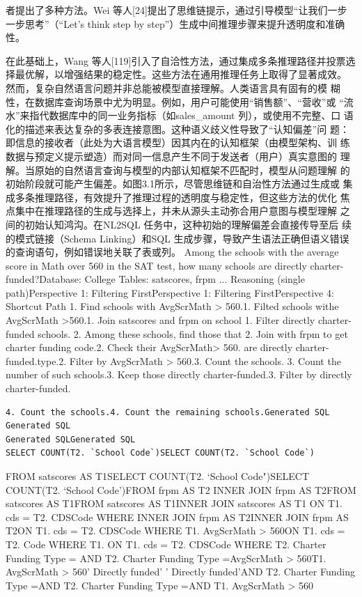 \documentclass[12pt,a4paper,openright,UTF8]{ctexbook}
\begin{document}
者提出了多种方法。Wei 等人[24]提出了思维链提示，通过引导模型“让我们一步 一步思考”（“Let’s think step by step”）生成中间推理步骤来提升透明度和准确性。

在此基础上，Wang 等人[119]引入了自洽性方法，通过集成多条推理路径并投票选 择最优解，以增强结果的稳定性。这些方法在通用推理任务上取得了显著成效。 然而，复杂自然语言问题并非总能被模型直接理解。人类语言具有固有的模 糊性，在数据库查询场景中尤为明显。例如，用户可能使用“销售额”、“营收”或 “流水”来指代数据库中的同一业务指标（如sales\_amount 列），或使用不完整、口 语化的描述来表达复杂的多表连接意图。这种语义歧义性导致了“认知偏差”问 题：即信息的接收者（此处为大语言模型）因其内在的认知框架（由模型架构、训 练数据与预定义提示塑造）而对同一信息产生不同于发送者（用户）真实意图的 理解。当原始的自然语言查询与模型的内部认知框架不匹配时，模型从问题理解 的初始阶段就可能产生偏差。如图3.1所示，尽管思维链和自治性方法通过生成或 集成多条推理路径，有效提升了推理过程的透明度与稳定性，但这些方法的优化 焦点集中在推理路径的生成与选择上，并未从源头主动弥合用户意图与模型理解 之间的初始认知鸿沟。在NL2SQL 任务中，这种初始的理解偏差会直接传导至后 续的模式链接（Schema Linking）和SQL 生成步骤，导致产生语法正确但语义错误 的查询语句，例如错误地关联了表或列。 Among the schools with the average score in Math over 560 in the SAT test, how many schools are directly charter-funded?Database: College Tables: satscores, frpm ... Reasoning (single path)Perspective 1: Filtering FirstPerspective 1: Filtering FirstPerspective 4: Shortcut Path 1. Find schools with AvgScrMath > 560.1. Filted schools withe AvgScrMath >560.1. Join satscores and frpm on school 1. Filter directly charter-funded schools. 2. Among these schools, find those that 2. Join with frpm to get charter funding code.2. Check their AvgScrMath> 560. are directly charter-funded.type.2. Filter by AvgScrMath > 560.3. Count the schools. 3. Count the number of such schools.3. Keep those directly charter-funded.3. Filter by directly charter-funded.

\begin{lstlisting}
4. Count the schools.4. Count the remaining schools.Generated SQL
Generated SQL
Generated SQLGenerated SQL
SELECT COUNT(T2. `School Code`)SELECT COUNT(T2. `School Code`)
\end{lstlisting}
FROM satscores AS T1SELECT COUNT(T2. `School Code")SELECT COUNT(T2. `School Code')FROM frpm AS T2 INNER JOIN frpm AS T2FROM satscores AS T1FROM satscores AS T1INNER JOIN satscores AS T1 ON T1. cds = T2. CDSCode WHERE INNER JOIN frpm AS T2INNER JOIN frpm AS T2ON T1. cds = T2. CDSCode WHERE T1. AvgScrMath > 560ON T1. cds = T2. Code WHERE T1. ON T1. cds = T2. CDSCode WHERE T2. Charter Funding Type = AND T2. Charter Funding Type =AvgScrMath > 560T1. AvgScrMath > 560' Directly funded' ' Directly funded'AND T2. Charter Funding Type =AND T2. Charter Funding Type =AND T1. AvgScrMath > 560
\end{document}
